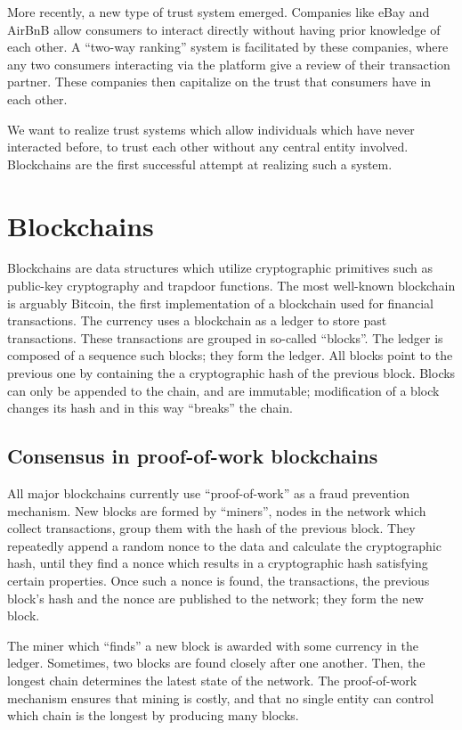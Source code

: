 More recently, a new type of trust system emerged. Companies like eBay and AirBnB allow consumers to interact directly without having prior knowledge of each other. A ``two-way ranking'' system is facilitated by these companies, where any two consumers interacting via the platform give a review of their transaction partner. These companies then capitalize on the trust that consumers have in each other.

We want to realize trust systems which allow individuals which have never interacted before, to trust each other without any central entity involved. Blockchains are the first successful attempt at realizing such a system. 

\section{Blockchains}
Blockchains are data structures which utilize cryptographic primitives such as public-key cryptography and trapdoor functions. The most well-known blockchain is arguably Bitcoin, the first implementation of a blockchain used for financial transactions. The currency uses a blockchain as a ledger to store past transactions. These transactions are grouped in so-called ``blocks''. The ledger is composed of a sequence such blocks; they form the ledger. All blocks point to the previous one by containing the a cryptographic hash of the previous block. Blocks can only be appended to the chain, and are immutable; modification of a block changes its hash and in this way ``breaks'' the chain.

\subsection{Consensus in proof-of-work blockchains}
All major blockchains currently use ``proof-of-work'' as a fraud prevention mechanism. New blocks are formed by ``miners'', nodes in the network which collect transactions, group them with the hash of the previous block. They repeatedly append a random nonce to the data and calculate the cryptographic hash, until they find a nonce which results in a cryptographic hash satisfying certain properties. Once such a nonce is found, the transactions, the previous block's hash and the nonce are published to the network; they form the new block. 

The miner which ``finds'' a new block is awarded with some currency in the ledger. Sometimes, two blocks are found closely after one another. Then, the longest chain determines the latest state of the network. The proof-of-work mechanism ensures that mining is costly, and that no single entity can control which chain is the longest by producing many blocks.

